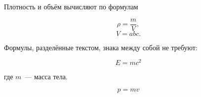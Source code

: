 Плотность и объём вычисляют по формулам

\begin{equation}
    \rho = \frac{m}{V},
\end{equation}
\begin{equation}
    V = a b c.
\end{equation}

Формулы, разделённые текстом, знака между собой не требуют:

\begin{equation}
    E = m c^2
\end{equation}

где $m$~--- масса тела.

\begin{equation}
    p = m v
\end{equation}
